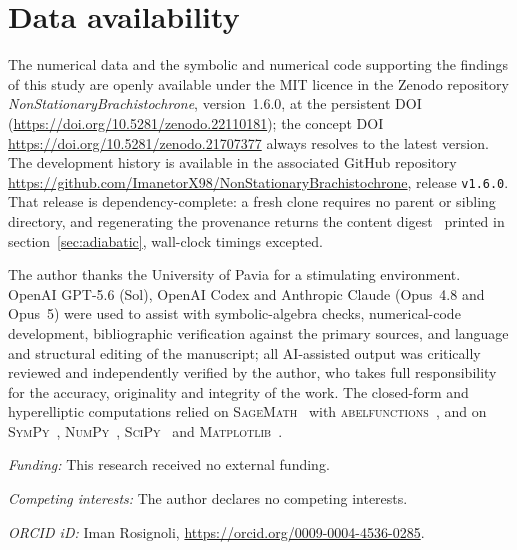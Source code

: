 \documentclass[12pt]{iopart}
\theoremstyle{plain}
\theoremstyle{definition}
\theoremstyle{remark}
\begin{document}
\section*{Data availability}
The numerical data and the symbolic and numerical code supporting the findings of this
study are openly available under the MIT licence in the Zenodo repository
\emph{NonStationaryBrachistochrone}, version~1.6.0, at the persistent
DOI~\cite{Rosignoli2026Code} (\url{https://doi.org/10.5281/zenodo.22110181}); the
concept DOI \url{https://doi.org/10.5281/zenodo.21707377} always resolves to the
latest version. The development history is available in the associated GitHub
repository \url{https://github.com/ImanetorX98/NonStationaryBrachistochrone},
release \texttt{v1.6.0}. That release is dependency-complete: a fresh clone
requires no parent or sibling directory, and regenerating the provenance returns
the content digest \ProvenanceDigest\ printed in
section~\ref{sec:adiabatic}, wall-clock timings excepted.

\ack
The author thanks the University of Pavia for a stimulating environment. OpenAI
GPT-5.6 (Sol), OpenAI Codex and Anthropic Claude (Opus~4.8 and Opus~5) were used to assist
with symbolic-algebra checks, numerical-code development, bibliographic verification against
the primary sources, and language and structural editing of the manuscript;
all AI-assisted output was critically reviewed and independently verified by the author,
who takes full responsibility for the accuracy, originality and integrity of the work. The
closed-form and hyperelliptic computations relied on \textsc{SageMath}~\cite{SageMath}
with \textsc{abelfunctions}~\cite{abelfunctions}, and on
\textsc{SymPy}~\cite{SymPy}, \textsc{NumPy}~\cite{NumPy}, \textsc{SciPy}~\cite{SciPy} and
\textsc{Matplotlib}~\cite{Matplotlib}.

\medskip\noindent\textit{Funding:} This research received no external funding.

\medskip\noindent\textit{Competing interests:} The author declares no competing interests.

\medskip\noindent\textit{ORCID iD:} Iman Rosignoli,
\url{https://orcid.org/0009-0004-4536-0285}.



\end{document}
